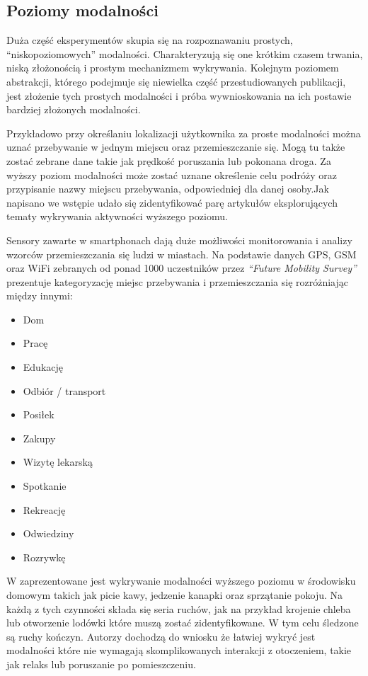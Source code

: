 \subsection{Poziomy modalności}
\label{sec:modality_levels}
Duża część eksperymentów skupia się na rozpoznawaniu prostych, ``niskopoziomowych'' modalności. Charakteryzują się one krótkim czasem trwania, niską złożonością i prostym mechanizmem wykrywania. Kolejnym poziomem abstrakcji, którego podejmuje się niewielka część przestudiowanych publikacji, jest złożenie tych prostych modalności i próba wywnioskowania na ich postawie bardziej złożonych modalności.

Przykładowo przy określaniu lokalizacji użytkownika za proste modalności można uznać przebywanie w jednym miejscu oraz przemieszczanie się. Mogą tu także zostać zebrane dane takie jak prędkość poruszania lub pokonana droga. Za wyższy poziom modalności może zostać uznane określenie celu podróży oraz przypisanie nazwy miejscu przebywania, odpowiedniej dla danej osoby.Jak napisano we wstępie udało się zidentyfikować parę artykułów eksplorujących tematy wykrywania aktywności wyższego poziomu.
\pagebreak

Sensory zawarte w smartphonach dają duże możliwości monitorowania i analizy wzorców przemieszczania się ludzi w miastach. Na podstawie danych GPS, GSM oraz WiFi zebranych od ponad 1000 uczestników przez \textit{``Future Mobility Survey''} \cite{S26} prezentuje kategoryzację miejsc przebywania i przemieszczania się rozróżniając między innymi:
\begin{itemize}
    \item Dom
    \item Pracę
    \item Edukację
    \item Odbiór / transport
    \item Posiłek
    \item Zakupy
    \item Wizytę lekarską
    \item Spotkanie
    \item Rekreację
    \item Odwiedziny
    \item Rozrywkę
\end{itemize}

W \cite{S38} zaprezentowane jest wykrywanie modalności wyższego poziomu w środowisku domowym takich jak picie kawy, jedzenie kanapki oraz sprzątanie pokoju. Na każdą z tych czynności składa się seria ruchów, jak na przykład krojenie chleba lub otworzenie lodówki które muszą zostać zidentyfikowane. W tym celu śledzone są ruchy kończyn. Autorzy dochodzą do wniosku że łatwiej wykryć jest modalności które nie wymagają skomplikowanych interakcji z otoczeniem, takie jak relaks lub poruszanie po pomieszczeniu.

